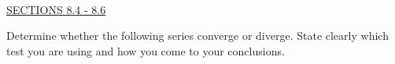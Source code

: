\documentclass{exam}
\begin{document}
\begin{questions}
\begin{parts}
\end{parts}

\newpage\thispagestyle{empty}
\ \\
\underline{SECTIONS 8.4 - 8.6}

\question Determine whether the following series converge or diverge.  State clearly which test you are using and how you come to your conclusions.
\begin{parts}
\end{parts}
\end{questions}
\end{document}
